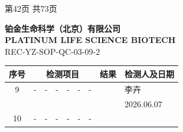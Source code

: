 \documentclass[UTF8,10pt,a4paper,fontset=fandol]{ctexart}
\newcommand{\fieldvalue}[1]{#1}
\newcommand{\handwritten}[1]{#1}
\begin{document}
\vfill
\begin{center}
第42页 共73页
\end{center}

\newpage

\noindent\textbf{铂金生命科学（北京）有限公司}\\
\textbf{PLATINUM LIFE SCIENCE BIOTECH}\\
\hfill REC-YZ-SOP-QC-03-09-2

\begin{center}
\small
\begin{tabular}{|c|c|c|c|c|c|c|p{2.2cm}|p{2.8cm}|}
\hline
序号 & \multicolumn{6}{c|}{检测项目} & 结果 & 检测人及日期\\
\hline
\fieldvalue{\handwritten{9}} &
\fieldvalue{\handwritten{-}} &
\fieldvalue{\handwritten{-}} &
\fieldvalue{\handwritten{-}} &
\fieldvalue{\handwritten{-}} &
\fieldvalue{\handwritten{-}} &
\fieldvalue{\handwritten{-}} &
&
\fieldvalue{\handwritten{李卉}}\\[-1mm]
&
&
&
&
&
&
&
&
\fieldvalue{\handwritten{2026.06.07}}\\
\hline
\fieldvalue{\handwritten{10}} &
\fieldvalue{\handwritten{-}} &
\fieldvalue{\handwritten{-}} &
\fieldvalue{\handwritten{-}} &
\fieldvalue{\handwritten{-}} &
\fieldvalue{\handwritten{-}} &
\fieldvalue{\handwritten{-}} &

\end{tabular}
\end{center}
\end{document}
